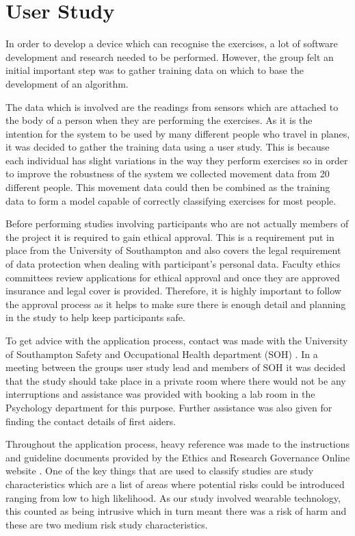 \chapter{User Study}
In order to develop a device which can recognise the exercises, a lot of software development and research needed to be performed. However, the group felt an initial important step was to gather training data on which to base the development of an algorithm.

The data which is involved are the readings from sensors which are attached to the body of a person when they are performing the exercises. As it is the intention for the system to be used by many different people who travel in planes, it was decided to gather the training data using a user study. This is because each individual has slight variations in the way they perform exercises so in order to improve the robustness of the system we collected movement data from 20 different people. This movement data could then be combined as the training data to form a model capable of correctly classifying exercises for most people.

Before performing studies involving participants who are not actually members of the project it is required to gain ethical approval. This is a requirement put in place from the University of Southampton and also covers the legal requirement of data protection when dealing with participant's personal data. Faculty ethics committees review applications for ethical approval and once they are approved insurance and legal cover is provided. Therefore, it is highly important to follow the approval process as it helps to make sure there is enough detail and planning in the study to help keep participants safe.

To get advice with the application process, contact was made with the University of Southampton Safety and Occupational Health department (SOH) \cite{sotonsoh}. In a meeting between the groups user study lead and members of SOH it was decided that the study should take place in a private room where there would not be any interruptions and assistance was provided with booking a lab room in the Psychology department for this purpose. Further assistance was also given for finding the contact details of first aiders.

Throughout the application process, heavy reference was made to the instructions and guideline documents provided by the Ethics and Research Governance Online website \cite{ergo}. One of the key things that are used to classify studies are study characteristics which are a list of areas where potential risks could be introduced ranging from low to high likelihood. As our study involved wearable technology, this counted as being intrusive which in turn meant there was a risk of harm and these are two medium risk study characteristics.


